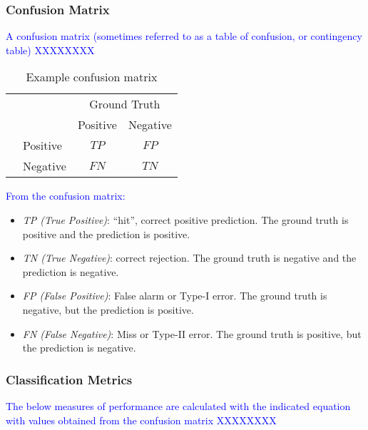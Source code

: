 \subsubsection{Confusion Matrix}
\textcolor{blue}{A confusion matrix (sometimes referred to as a table of confusion, or contingency table) XXXXXXXX}

\begin{table}
	\centering
	\begin{tabular}{l|l|c|c|}
		\multicolumn{2}{c}{}&\multicolumn{2}{c}{Ground Truth}\\ 
		\cline{3-4}
		\multicolumn{2}{c|}{}&Positive&Negative\\ 
		\cline{2-4}
		\multirow{2}{*}{\rotatebox{90}{Pred}}& Positive & $TP$ & $FP$ \\ 
		\cline{2-4}
		& Negative & $FN$ & $TN$ \\ 
		\cline{2-4}
	\end{tabular}
	\caption{Example confusion matrix}
	\label{tab:sample_conf_matrix}
\end{table}

\textcolor{blue}{From the confusion matrix:}

\begin{itemize}[noitemsep,topsep=0pt]
	\item \textit{TP (True Positive)}: ``hit'', correct positive prediction. The ground truth is positive and the prediction is positive.
	
	\item \textit{TN (True Negative)}: correct rejection. The ground truth is negative and the prediction is negative.
	
	\item \textit{FP (False Positive)}: False alarm or Type-I error. The ground truth is negative, but the prediction is positive.
	
	\item \textit{FN (False Negative)}: Miss or Type-II error. The ground truth is positive, but the prediction is negative.
\end{itemize}

\subsubsection{Classification Metrics}

\textcolor{blue}{The below measures of performance are calculated with the indicated equation with values obtained from the confusion matrix XXXXXXXX}


